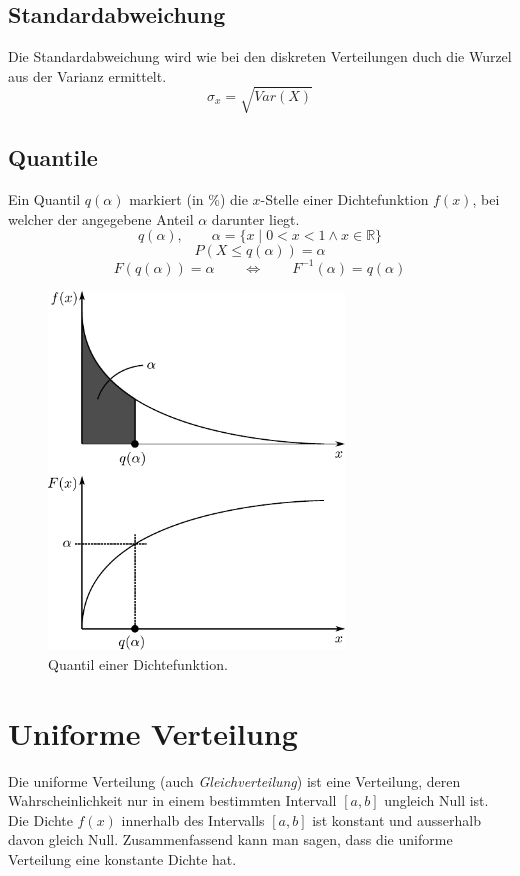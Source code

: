 \subsection{Standardabweichung}
Die Standardabweichung wird wie bei den diskreten Verteilungen 
duch die Wurzel aus der Varianz ermittelt.
\[  
	\sigma_x = \sqrt{Var(X)}
\]

\subsection{Quantile}
Ein Quantil $q(\alpha)$ markiert (in \%) die $x$-Stelle einer 
Dichtefunktion $f(x)$, bei welcher der angegebene Anteil $\alpha$
darunter liegt.
\[ 
	q(\alpha), 
		\qquad \alpha = 
		\{x \mid 0 < x < 1 \land x \in \mathbb{R}\}
\]
\[
	P(X \leq q(\alpha)) = \alpha
\]
\[ 
	F(q(\alpha)) = \alpha  
		\qquad \Leftrightarrow \qquad
		F^{-1}(\alpha) = q(\alpha)
\]

\begin{figure}[h!]
	\centering
	\includegraphics[width=0.7\textwidth]{dichtefunktion-quantile.pdf}
	\caption{Quantil einer Dichtefunktion.}
	\label{fig:dichte-quantil}
\end{figure}

\clearpage
\newpage
\section{Uniforme Verteilung}

Die uniforme Verteilung (auch \emph{Gleichverteilung}) ist eine
Verteilung, deren Wahrscheinlichkeit nur in einem bestimmten 
Intervall $[a,b]$ ungleich Null ist. Die Dichte $f(x)$ innerhalb 
des Intervalls $[a,b]$ ist konstant und ausserhalb davon gleich Null.
Zusammenfassend kann man sagen, dass die uniforme Verteilung eine
konstante Dichte hat.

